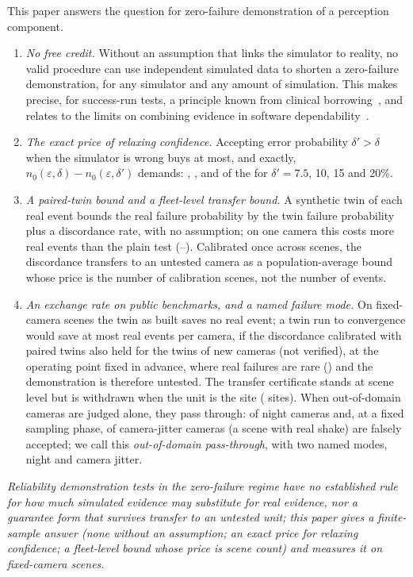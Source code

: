 This paper answers the question for zero-failure demonstration of a perception component.
\begin{enumerate}
\item \emph{No free credit.} Without an assumption that links the simulator to reality, no valid procedure can use
independent simulated data to shorten a zero-failure demonstration, for any simulator and any amount of simulation.
This makes precise, for success-run tests, a principle known from clinical
borrowing~\cite{koppschneider2020}, and relates to the limits on combining evidence in software
dependability~\cite{littlewood1993}.
\item \emph{The exact price of relaxing confidence.} Accepting error probability $\delta'>\delta$ when the simulator is
wrong buys at most, and exactly, $n_0(\varepsilon,\delta)-n_0(\varepsilon,\delta')$ demands: \ncExactA, \ncExactB,
\ncExactC{} and \ncExactD{} of the \nNzero{} for $\delta'=7.5$, 10, 15 and 20\%.
\item \emph{A paired-twin bound and a fleet-level transfer bound.} A synthetic twin of each real event bounds the real
failure probability by the twin failure probability plus a discordance rate, with no assumption; on one camera this
costs more real events than the plain test (\nCthreeA--\nCthreeC). Calibrated once across scenes, the discordance
transfers to an untested camera as a population-average bound whose price is the number of calibration scenes, not the
number of events.
\item \emph{An exchange rate on public benchmarks, and a named failure mode.} On \nMainScenes{} fixed-camera scenes the twin
as built saves no real event; a twin run to convergence would save at most \nSavedOP{} real events per camera, if the discordance calibrated with
paired twins also held for the twins of new cameras (not verified), at the
operating point fixed in advance, where real failures are rare (\nPmainOP) and the demonstration is therefore untested.
The transfer certificate stands at scene level but is withdrawn when the unit is the site (\nSiteSm{} sites).
When out-of-domain cameras are judged alone, they pass through: \nNightFC{} of \nNightScenes{} night cameras and, at a
fixed sampling phase, \nOODSJitfa{} of \nJitterScenes{} camera-jitter cameras (a scene with real shake) are falsely accepted; we call this
\emph{out-of-domain pass-through}, with two named modes, night and camera jitter.
\end{enumerate}

\emph{Reliability demonstration tests in the zero-failure regime have no established rule for how much simulated
evidence may substitute for real evidence, nor a guarantee form that survives transfer to an untested unit; this paper
gives a finite-sample answer (none without an assumption; an exact price for relaxing confidence; a fleet-level
bound whose price is scene count) and measures it on \nMainScenes{} fixed-camera scenes.}

